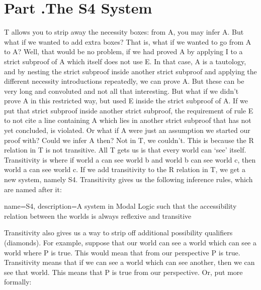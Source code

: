 \section{Part \thechapcount.\theseccount The S4 System}
T allows you to strip away the necessity boxes: from \ebox A, you may infer A. But what if we wanted to add extra boxes? That is, what if we wanted to go from \ebox A to \ebox \ebox A? Well, that would be no problem, if we had proved \ebox A by applying \ebox I to a strict subproof of A which itself does not use \ebox E. In that case, A is a tautology, and by nesting the strict subproof inside another strict subproof and applying the different necessity introductions repeatedly, we can prove \ebox \ebox A. But these can be very long and convoluted and not all that interesting. But what if we didn’t prove \ebox A in this restricted way, but used \ebox E inside the strict subproof of A. If we put that strict subproof inside another strict subproof, the requirement of rule \ebox E to not cite a line containing \ebox A which lies in another strict subproof that has not yet concluded, is violated. Or what if \ebox A were just an assumption we started our proof with? Could we infer \ebox \ebox A then? Not in T, we couldn’t. This is because the R relation in T is not transitive. All T gets us is that every world can `see' itself. Transitivity is where if world a can see world b and world b can see world c, then world a can see world c. If we add transitivity to the R relation in T, we get a new system, namely \Gls{S4}. Transitivity gives us the following inference rules, which are named after it:\autocite[168-69]{Sider}

{
name=S4,
description={A system in Modal Logic such that the \gls{accessibility relation} between the \glspl{world} is always \gls{reflexive} and \gls{transitive}}
}


Transitivity also gives us a way to strip off additional possibility qualifiers (diamonds). For example, suppose that our world can see a world which can see a world where P is true. This would mean that from our perspective \ediamond \ediamond P is true. Transitivity means that if we can see a world which can see another, then we can see that world. This means that \ediamond P is true from our perspective. Or, put more formally:

